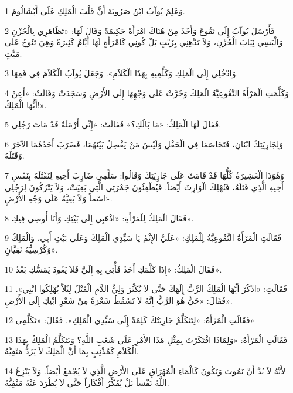 \par 1 وَعَلِمَ يُوآبُ ابْنُ صَرُويَةَ أَنَّ قَلْبَ الْمَلِكِ عَلَى أَبْشَالُومَ.
\par 2 فَأَرْسَلَ يُوآبُ إِلَى تَقُوعَ وَأَخَذَ مِنْ هُنَاكَ امْرَأَةً حَكِيمَةً وَقَالَ لَهَا: «تَظَاهَرِي بِالْحُزْنِ وَالْبَسِي ثِيَابَ الْحُزْنِ، وَلاَ تَدَّهِنِي بِزَيْتٍ بَلْ كُونِي كَامْرَأَةٍ لَهَا أَيَّامٌ كَثِيرَةٌ وَهِيَ تَنُوحُ عَلَى مَيِّتٍ.
\par 3 وَادْخُلِي إِلَى الْمَلِكِ وَكَلِّمِيهِ بِهَذَا الْكَلاَمِ». وَجَعَلَ يُوآبُ الْكَلاَمَ فِي فَمِهَا.
\par 4 وَكَلَّمَتِ الْمَرْأَةُ التَّقُوعِيَّةُ الْمَلِكَ وَخَرَّتْ عَلَى وَجْهِهَا إِلَى الأَرْضِ وَسَجَدَتْ وَقَالَتْ: «أَعِنْ أَيُّهَا الْمَلِكُ!».
\par 5 فَقَالَ لَهَا الْمَلِكُ: «مَا بَالُكِ؟» فَقَالَتْ: «إِنِّي أَرْمَلَةٌ قَدْ مَاتَ رَجُلِي.
\par 6 وَلِجَارِيَتِكَ ابْنَانِ، فَتَخَاصَمَا فِي الْحَقْلِ وَلَيْسَ مَنْ يَفْصِلُ بَيْنَهُمَا، فَضَرَبَ أَحَدُهُمَا الآخَرَ وَقَتَلَهُ.
\par 7 وَهُوَذَا الْعَشِيرَةُ كُلُّهَا قَدْ قَامَتْ عَلَى جَارِيَتِكَ وَقَالُوا: سَلِّمِي ضَارِبَ أَخِيهِ لِنَقْتُلَهُ بِنَفْسِ أَخِيهِ الَّذِي قَتَلَهُ، فَنُهْلِكَ الْوَارِثَ أَيْضاً. فَيُطْفِئُونَ جَمْرَتِي الَّتِي بَقِيَتْ، وَلاَ يَتْرُكُونَ لِرَجُلِي اسْماً وَلاَ بَقِيَّةً عَلَى وَجْهِ الأَرْضِ».
\par 8 فَقَالَ الْمَلِكُ لِلْمَرْأَةِ: «اذْهَبِي إِلَى بَيْتِكِ وَأَنَا أُوصِي فِيكِ».
\par 9 فَقَالَتِ الْمَرْأَةُ التَّقُوعِيَّةُ لِلْمَلِكِ: «عَلَيَّ الإِثْمُ يَا سَيِّدِي الْمَلِكَ وَعَلَى بَيْتِ أَبِي، وَالْمَلِكُ وَكُرْسِيُّهُ نَقِيَّانِ».
\par 10 فَقَالَ الْمَلِكُ: «إِذَا كَلَّمَكِ أَحَدٌ فَأْتِي بِهِ إِلَيَّ فَلاَ يَعُودَ يَمَسُّكِ بَعْدُ».
\par 11 فَقَالَتِ: «اذْكُرْ أَيُّهَا الْمَلِكُ الرَّبَّ إِلَهَكَ حَتَّى لاَ يُكَثِّرَ وَلِيُّ الدَّمِ الْقَتْلَ لِئَلاَّ يُهْلِكُوا ابْنِي». فَقَالَ: «حَيٌّ هُوَ الرَّبُّ إِنَّهُ لاَ تَسْقُطُ شَعْرَةٌ مِنْ شَعْرِ ابْنِكِ إِلَى الأَرْضِ».
\par 12 فَقَالَتِ الْمَرْأَةُ: «لِتَتَكَلَّمْ جَارِيَتُكَ كَلِمَةً إِلَى سَيِّدِي الْمَلِكِ». فَقَالَ: «تَكَلَّمِي»
\par 13 فَقَالَتِ الْمَرْأَةُ: «وَلِمَاذَا افْتَكَرْتَ بِمِثْلِ هَذَا الأَمْرِ عَلَى شَعْبِ اللَّهِ؟ وَيَتَكَلَّمُ الْمَلِكُ بِهَذَا الْكَلاَمِ كَمُذْنِبٍ بِمَا أَنَّ الْمَلِكَ لاَ يَرُدُّ مَنْفِيَّهُ.
\par 14 لأَنَّهُ لاَ بُدَّ أَنْ نَمُوتَ وَنَكُونَ كَالْمَاءِ الْمَُهْرَاقِ عَلَى الأَرْضِ الَّذِي لاَ يُجْمَعُ أَيْضاً. وَلاَ يَنْزِعُ اللَّهُ نَفْساً بَلْ يُفَكِّرُ أَفْكَاراً حَتَّى لاَ يُطْرَدَ عَنْهُ مَنْفِيُّهُ.
